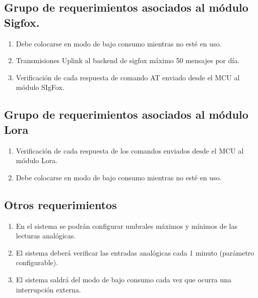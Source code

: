 \subsection{Grupo de requerimientos asociados al módulo Sigfox.}

	\begin{enumerate}

		\item Debe colocarse en modo de bajo consumo mientras no esté en uso.

		\item Transmisiones Uplink al backend de sigfox máximo 50 mensajes por día.

		\item Verificación de cada respuesta de comando AT enviado desde el MCU al módulo SIgFox.

	\end{enumerate}





\subsection{Grupo de requerimientos asociados al módulo Lora}

	\begin{enumerate}

		\item Verificación de cada respuesta de los comandos enviados desde el MCU al módulo Lora.

		\item Debe colocarse en modo de bajo consumo mientras no esté en uso.

	\end{enumerate}



\subsection{Otros requerimientos}

\begin{enumerate}

	\item En el sistema se podrán configurar umbrales máximos y mínimos de las lecturas analógicas.

	\item El sistema deberá verificar las entradas analógicas cada 1 minuto (parámetro configurable).

	\item El sistema saldrá del modo de bajo consumo cada vez que ocurra una interrupción externa.

\end{enumerate}





